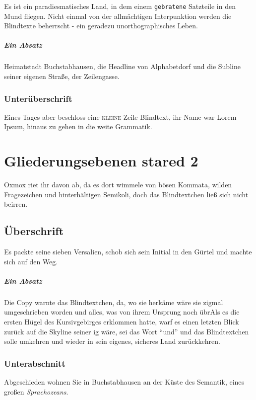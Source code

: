 \documentclass[%
	12pt,%
	a4paper,%
	oneside,%
	liststotoc, idxtotoc, bibtotoc, %
	parskip=half,%
	nochapterprefix,%
	appendixprefix, %
	headings=small,%
]{scrreprt}
\begin{document}
Es ist ein paradiesmatisches Land, in dem einem \texttt{gebratene} Satzteile in den Mund fliegen. Nicht einmal von der allmächtigen Interpunktion werden die Blindtexte beherrscht - ein geradezu unorthographisches Leben. 

\paragraph*{Ein Absatz}
Heimatstadt Buchstabhausen, die Headline von Alphabetdorf und die Subline seiner eigenen Straße, der Zeilengasse.

\subsection*{Unterüberschrift}

Eines Tages aber beschloss eine \textsc{kleine} Zeile Blindtext, ihr Name war Lorem Ipsum, hinaus zu gehen in die weite Grammatik.

\chapter*{Gliederungsebenen stared 2}
\label{sec:Gliederung4}

Oxmox riet ihr davon ab, da es dort wimmele von bösen Kommata, wilden Fragezeichen und hinterhältigen Semikoli, doch das Blindtextchen ließ sich nicht beirren. 

\section*{Überschrift}

Es packte seine sieben Versalien, schob sich sein Initial in den Gürtel und machte sich auf den Weg. 

\paragraph*{Ein Absatz}
Die Copy warnte das Blindtextchen, da, wo sie herkäme wäre sie zigmal umgeschrieben worden und alles, was von ihrem Ursprung noch übrAls es die ersten Hügel des Kursivgebirges erklommen hatte, warf es einen letzten Blick zurück auf die Skyline seiner ig wäre, sei das Wort "`und"'  und das Blindtextchen solle umkehren und wieder in sein eigenes, sicheres Land zurückkehren.

\subsection*{Unterabschnitt}
Abgeschieden wohnen Sie in Buchstabhausen an der Küste des Semantik, eines großen \textsl{Sprachozeans}.
\end{document}
